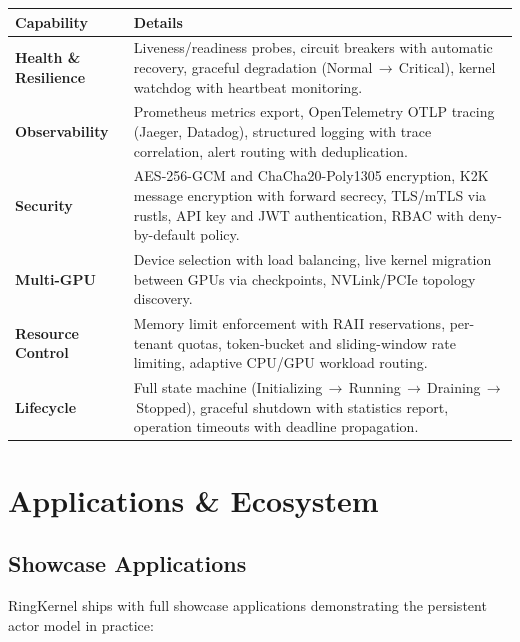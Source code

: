 \documentclass[11pt,a4paper]{article}
\begin{document}
\begin{table}[h!]
\centering
\renewcommand{\arraystretch}{1.2}
\begin{tabularx}{\textwidth}{>{\bfseries\color{brand}}l X}
\toprule
\textbf{Capability} & \textbf{Details} \\
\midrule
Health \& Resilience &
  Liveness/readiness probes, circuit breakers with automatic recovery,
  graceful degradation (Normal\,$\to$\,Critical), kernel watchdog with
  heartbeat monitoring. \\
Observability &
  Prometheus metrics export, OpenTelemetry OTLP tracing (Jaeger, Datadog),
  structured logging with trace correlation, alert routing with deduplication. \\
Security &
  AES-256-GCM and ChaCha20-Poly1305 encryption, K2K message encryption with
  forward secrecy, TLS/mTLS via rustls, API key and JWT authentication,
  RBAC with deny-by-default policy. \\
Multi-GPU &
  Device selection with load balancing, live kernel migration between GPUs
  via checkpoints, NVLink/PCIe topology discovery. \\
Resource Control &
  Memory limit enforcement with RAII reservations, per-tenant quotas,
  token-bucket and sliding-window rate limiting, adaptive CPU/GPU workload
  routing. \\
Lifecycle &
  Full state machine (Initializing\,$\to$\,Running\,$\to$\,Draining\,$\to$\,Stopped),
  graceful shutdown with statistics report, operation timeouts with deadline
  propagation. \\
\bottomrule
\end{tabularx}
\end{table}

\newpage
\section{Applications \& Ecosystem}

\subsection{Showcase Applications}

RingKernel ships with full showcase applications demonstrating the persistent
actor model in practice:
\end{document}
